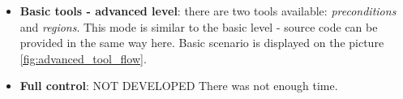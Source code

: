 \begin{itemize}
  \item {\bf Basic tools - advanced level}: there are two tools available: \emph{preconditions} and \emph{regions}. This mode is similar to the basic level - source code can be provided in the same way here. Basic scenario is displayed on the picture \ref{fig:advanced_tool_flow}.
  
  \item {\bf Full control}: NOT DEVELOPED
  There was not enough time.
\end{itemize}